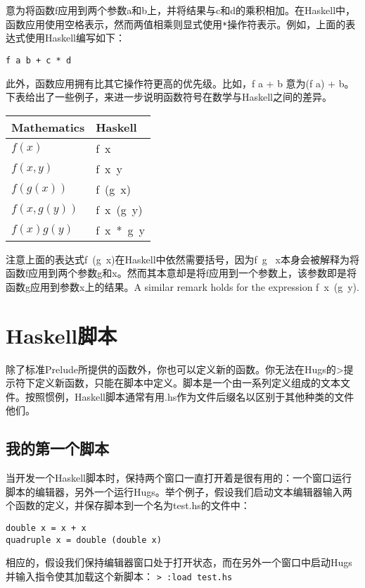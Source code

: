 意为将函数f应用到两个参数a和b上，并将结果与c和d的乘积相加。在Haskell中，函数应用使用空格表示，然而两值相乘则显式使用\verb|*|操作符表示。例如，上面的表达式使用Haskell编写如下：

\verb|f a b + c * d|

此外，函数应用拥有比其它操作符更高的优先级。比如，f a + b 意为(f a) + b。下表给出了一些例子，来进一步说明函数符号在数学与Haskell之间的差异。

\begin{table}[htbp]
\label{tab:threesome}
\centering
\begin{tabular}{ll}
\hline
Mathematics & Haskell  \\
\hline
$f(x)$ & f~x \\
$f(x,y)$ & f~x~y \\
$f(g(x))$ & f~(g~x) \\
$f(x,g(y))$ & f~x~(g~y)\\
$f(x)g(y)$ & f~x~*~g~y\\
\hline
\end{tabular}
\end{table}

注意上面的表达式f~(g~x)在Haskell中依然需要括号，因为f~g~ x本身会被解释为将函数f应用到两个参数g和x。然而其本意却是将f应用到一个参数上，该参数即是将函数g应用到参数x上的结果。A
similar remark holds for the expression f~x~(g~y).

\section{Haskell脚本}
除了标准Prelude所提供的函数外，你也可以定义新的函数。你无法在Hugs的>提示符下定义新函数，只能在脚本中定义。脚本是一个由一系列定义组成的文本文件。按照惯例，Haskell脚本通常有用.hs作为文件后缀名以区别于其他种类的文件他们。

\subsection{我的第一个脚本}
当开发一个Haskell脚本时，保持两个窗口一直打开着是很有用的：一个窗口运行脚本的编辑器，另外一个运行Hugs。举个例子，假设我们启动文本编辑器输入两个函数的定义，并保存脚本到一个名为test.hs的文件中：

\begin{verbatim}
double x = x + x
quadruple x = double (double x)
\end{verbatim}

相应的，假设我们保持编辑器窗口处于打开状态，而在另外一个窗口中启动Hugs并输入指令使其加载这个新脚本：
\verb|> :load test.hs|


